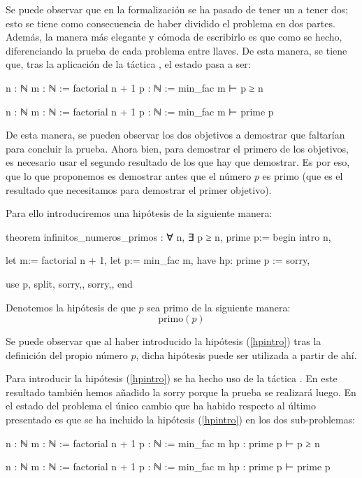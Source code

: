 Se puede observar que en la formalización se ha pasado de tener un
 a tener dos; esto se tiene como consecuencia de haber
dividido el problema en dos partes. Además, la manera más elegante y cómoda
de escribirlo es que como se hecho, diferenciando la prueba de cada problema
entre llaves. De esta manera, se tiene que, tras la aplicación de la táctica
, el estado pasa a ser:
\begin{leancode}
n : ℕ
m : ℕ := factorial n + 1
p : ℕ := min_fac m
⊢ p ≥ n

n : ℕ
m : ℕ := factorial n + 1
p : ℕ := min_fac m
⊢ prime p
\end{leancode}

De esta manera, se pueden observar los dos objetivos a demostrar que faltarían
para concluir la prueba. Ahora bien, para demostrar el primero de los objetivos,
es necesario usar el segundo resultado de los que hay que demostrar. Es por eso,
que lo que proponemos es demostrar antes que el número \(p\) es primo (que es
el resultado que necesitamos para demostrar el primer objetivo).

Para ello introduciremos una hipótesis de la siguiente manera:

\begin{leancode}
theorem infinitos_numeros_primos : ∀ n, ∃ p ≥ n, prime p:=
begin
  intro n,

  let m:= factorial n + 1,
  let p:= min_fac m,
  have hp: prime p := sorry,

  use p,
  split,
  {sorry,},
  {sorry,},
end
\end{leancode}

Denotemos la hipótesis de que \(p\) sea primo de la siguiente manera:
\begin{equation}\tag{hp}\label{hpintro}
  \text{primo}(p)
\end{equation}

Se puede observar que al haber introducido la hipótesis (\ref{hpintro}) tras
la definición del propio número \(p\), dicha hipótesis puede ser utilizada
a partir de ahí.

Para introducir la hipótesis (\ref{hpintro}) se ha hecho uso de la táctica
. En este resultado también hemos añadido la 
{sorry} porque la prueba se realizará luego. En el estado del problema el único
cambio que ha habido respecto al último presentado es que se ha incluido la
hipótesis (\ref{hpintro}) en los dos sub-problemas:
\begin{leancode}
n : ℕ
m : ℕ := factorial n + 1
p : ℕ := min_fac m
hp : prime p
⊢ p ≥ n

n : ℕ
m : ℕ := factorial n + 1
p : ℕ := min_fac m
hp : prime p
⊢ prime p
\end{leancode}

